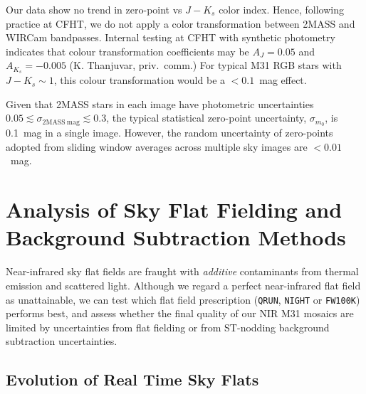 \documentclass[iop]{emulateapj}
\begin{document}
Our data show no trend in zero-point vs $J-K_s$ color index.
Hence, following practice at CFHT, we do not apply a color transformation between 2MASS and WIRCam bandpasses.
Internal testing at CFHT with synthetic photometry indicates that colour transformation coefficients may be $A_J = 0.05$ and $A_{K_s}=-0.005$ (K. Thanjuvar, priv.\ comm.)
For typical M31 RGB stars with $J-K_s\sim 1$, this colour transformation would be a $< 0.1$~mag effect.

Given that 2MASS stars in each image have photometric uncertainties $0.05 \lesssim \sigma_{\mathrm{2MASS~mag}} \lesssim 0.3$, the typical statistical zero-point uncertainty, $\sigma_{m_0}$, is 0.1~mag in a single image.
However, the random uncertainty of zero-points adopted from sliding window averages across multiple sky images are $<0.01$~mag.

\section{Analysis of Sky Flat Fielding and Background Subtraction Methods}
\label{sec:flatanalysis}

Near-infrared sky flat fields are fraught with \emph{additive} contaminants from thermal emission and scattered light.
Although we regard a perfect near-infrared flat field as unattainable, we can test which flat field prescription (\texttt{QRUN}, \texttt{NIGHT} or \texttt{FW100K}) performs best, and assess whether the final quality of our NIR M31 mosaics are limited by uncertainties from flat fielding or from ST-nodding background subtraction uncertainties.


\subsection{Evolution of Real Time Sky Flats}
\label{sec:flatevo}
\end{document}
